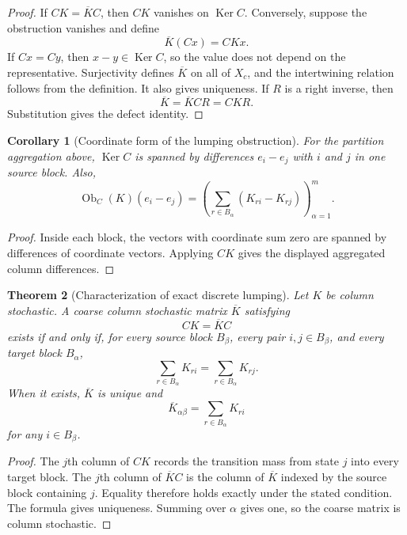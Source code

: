 \documentclass[11pt,a4paper]{article}
\newtheorem{theorem}{Theorem}[section]
\newtheorem{corollary}[theorem]{Corollary}
\theoremstyle{definition}
\theoremstyle{remark}
\newcommand{\Ker}{\operatorname{Ker}}
\newcommand{\Ob}{\operatorname{Ob}}
\begin{document}
\begin{proof}
If \(CK=\overline KC\), then \(CK\) vanishes on \(\Ker C\). Conversely, suppose the obstruction vanishes and define
\[
\overline K(Cx)=CKx.
\]
If \(Cx=Cy\), then \(x-y\in\Ker C\), so the value does not depend on the representative. Surjectivity defines \(\overline K\) on all of \(X_c\), and the intertwining relation follows from the definition. It also gives uniqueness. If \(R\) is a right inverse, then
\[
\overline K=\overline KCR=CKR.
\]
Substitution gives the defect identity.
\end{proof}

\begin{corollary}[Coordinate form of the lumping obstruction]\label{extended:record:031}\label{extended:cor:lumping_obstruction_coordinates}
For the partition aggregation above, \(\Ker C\) is spanned by differences \(e_i-e_j\) with \(i\) and \(j\) in one source block. Also,
\[
\Ob_C(K)(e_i-e_j)
=
\left(
\sum_{r\in B_\alpha}(K_{ri}-K_{rj})
\right)_{\alpha=1}^m.
\]
\end{corollary}

\begin{proof}
Inside each block, the vectors with coordinate sum zero are spanned by differences of coordinate vectors. Applying \(CK\) gives the displayed aggregated column differences.
\end{proof}

\begin{theorem}[Characterization of exact discrete lumping]\label{extended:record:032}\label{extended:thm:lumping_characterization}
Let \(K\) be column stochastic. A coarse column stochastic matrix \(\overline K\) satisfying
\[
CK=\overline KC
\]
exists if and only if, for every source block \(B_\beta\), every pair \(i,j\in B_\beta\), and every target block \(B_\alpha\),
\[
\sum_{r\in B_\alpha}K_{ri}
=
\sum_{r\in B_\alpha}K_{rj}.
\]
When it exists, \(\overline K\) is unique and
\[
\overline K_{\alpha\beta}
=
\sum_{r\in B_\alpha}K_{ri}
\]
for any \(i\in B_\beta\).
\end{theorem}

\begin{proof}
The \(j\)th column of \(CK\) records the transition mass from state \(j\) into every target block. The \(j\)th column of \(\overline KC\) is the column of \(\overline K\) indexed by the source block containing \(j\). Equality therefore holds exactly under the stated condition. The formula gives uniqueness. Summing over \(\alpha\) gives one, so the coarse matrix is column stochastic.
\end{proof}
\end{document}

